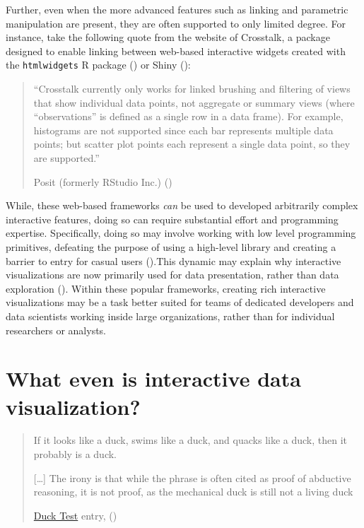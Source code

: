 \documentclass[
  openany]{book}
\theoremstyle{definition}
\theoremstyle{definition}
\theoremstyle{definition}
\theoremstyle{definition}
\theoremstyle{remark}
\begin{document}
Further, even when the more advanced features such as linking and parametric manipulation are present, they are often supported to only limited degree. For instance, take the following quote from the website of Crosstalk, a package designed to enable linking between web-based interactive widgets created with the \texttt{htmlwidgets} R package () or Shiny ():

\begin{quote}
``Crosstalk currently only works for linked brushing and filtering of views that show individual data points, not aggregate or summary views (where ``observations'' is defined as a single row in a data frame). For example, histograms are not supported since each bar represents multiple data points; but scatter plot points each represent a single data point, so they are supported.''

Posit (formerly RStudio Inc.) ()
\end{quote}

While, these web-based frameworks \emph{can} be used to developed arbitrarily complex interactive features, doing so can require substantial effort and programming expertise. Specifically, doing so may involve working with low level programming primitives, defeating the purpose of using a high-level library and creating a barrier to entry for casual users ().This dynamic may explain why interactive visualizations are now primarily used for data presentation, rather than data exploration (). Within these popular frameworks, creating rich interactive visualizations may be a task better suited for teams of dedicated developers and data scientists working inside large organizations, rather than for individual researchers or analysts.

\section{What even is interactive data visualization?}\label{what-is-interactive-visualization}

\begin{quote}
If it looks like a duck, swims like a duck, and quacks like a duck, then it probably is a duck.

{[}\ldots{]} The irony is that while the phrase is often cited as proof of abductive reasoning, it is not proof, as the mechanical duck is still not a living duck

\href{https://en.wikipedia.org/wiki/Duck_test}{Duck Test} entry, ()
\end{quote}
\end{document}
